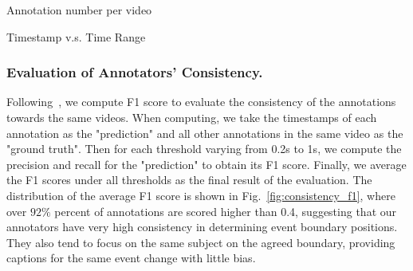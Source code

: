 \documentclass[runningheads]{llncs}
\begin{document}
\noindent
\begin{minipage}{\textwidth}
\begin{center}
\begin{minipage}[t]{0.52\textwidth}
\makeatletter{}
\caption{Annotation number per video}
\setlength{\belowcaptionskip}{0.5cm}
\label{table:annotation_num}
\end{minipage}
\begin{minipage}[t]{0.46\textwidth}
\makeatletter{}
\caption{Timestamp v.s. Time Range}
\setlength{\belowcaptionskip}{0.5cm}
\label{table:timestamp_range}
\end{minipage}
\end{center}
\end{minipage} 
\subsubsection{Evaluation of Annotators' Consistency.}
\label{annotation_details:f1_consistency}
Following~\cite{shou2021generic}, we compute F1 score to evaluate the consistency of the annotations towards the same videos. When computing, we take the timestamps of each annotation as the "prediction" and all other annotations in the same video as the "ground truth". Then for each threshold varying from 0.2s to 1s, we compute the precision and recall for the "prediction" to obtain its F1 score. Finally, we average the F1 scores under all thresholds as the final result of the evaluation. The distribution of the average F1 score is shown in Fig.~\ref{fig:consistency_f1}, where over $92\%$ percent of annotations are scored higher than 0.4, suggesting that our annotators have very high consistency in determining event boundary positions. They also tend to focus on the same subject on the agreed boundary, providing captions for the same event change with little bias.
\end{document}
